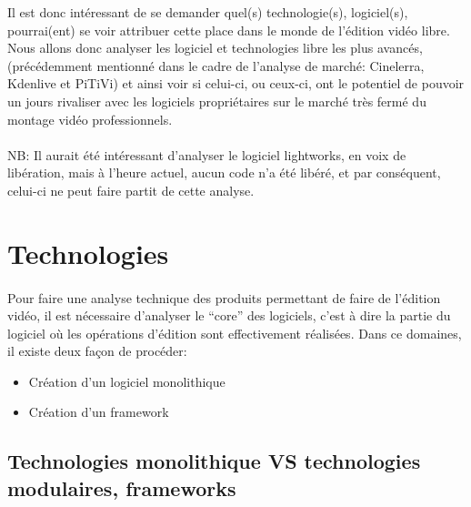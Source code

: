 Il est donc intéressant de se demander quel(s) technologie(s),
logiciel(s), pourrai(ent) se voir attribuer cette place dans le monde
de l'édition vidéo libre. Nous allons donc analyser les logiciel
et technologies libre les plus avancés, (précédemment mentionné
dans le cadre de l'analyse de marché: Cinelerra, Kdenlive et PiTiVi)
et ainsi voir si celui-ci, ou ceux-ci, ont le potentiel de pouvoir un
jours rivaliser avec les logiciels propriétaires sur le marché très
fermé du montage vidéo professionnels.

\paragraph{}

NB: Il aurait été intéressant d'analyser le logiciel lightworks,
en voix de libération, mais à l'heure actuel, aucun code n'a été
libéré, et par conséquent, celui-ci ne peut faire partit de cette
analyse.

\newpage

\section{Technologies}

\paragraph{}

Pour faire une analyse technique des produits permettant de faire
de l'édition vidéo, il est nécessaire d'analyser le ``core'' des
logiciels, c'est à dire la partie du logiciel où les opérations
d'édition sont effectivement réalisées. Dans ce domaines, il existe
deux façon de procéder:

\begin{itemize} \setlength{\itemsep}{2mm}

  \item{Création d'un logiciel monolithique}

  \item{Création d'un framework  }

\end{itemize}

\subsection {Technologies monolithique VS technologies
modulaires, frameworks}


